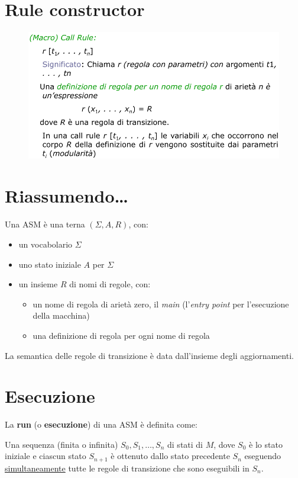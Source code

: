 \section{Rule constructor}

\begin{figure}[H]
    \includegraphics[width=0.8\linewidth]{chapters/1-asm/images/call-rule.png}
\end{figure}

\section{Riassumendo\dots}
Una ASM è una terna $(\Sigma, A, R)$, con:
\begin{itemize}
    \item un vocabolario $\Sigma$
    \item uno stato iniziale $A$ per $\Sigma$
    \item un insieme $R$ di nomi di regole, con:
    \begin{itemize}
        \item un nome di regola di arietà zero, il \textit{main} (l'\textit{entry point}
        per l'esecuzione della macchina)
        \item una definizione di regola per ogni nome di regola
    \end{itemize}
\end{itemize}

\noindent La semantica delle regole di transizione è data dall'insieme degli 
aggiornamenti.


\newpage
\section{Esecuzione}
La \textbf{run} (o \textbf{esecuzione}) di una ASM è definita come:

\noindent Una sequenza (finita o infinita) $S_0, S_1, \dots, S_n$ di stati di $M$, dove 
$S_0$ è lo stato iniziale e ciascun stato $S_{n+1}$ è ottenuto dallo stato precedente 
$S_n$ eseguendo \underline{simultaneamente} tutte le regole di transizione che 
sono eseguibili in $S_n$.

